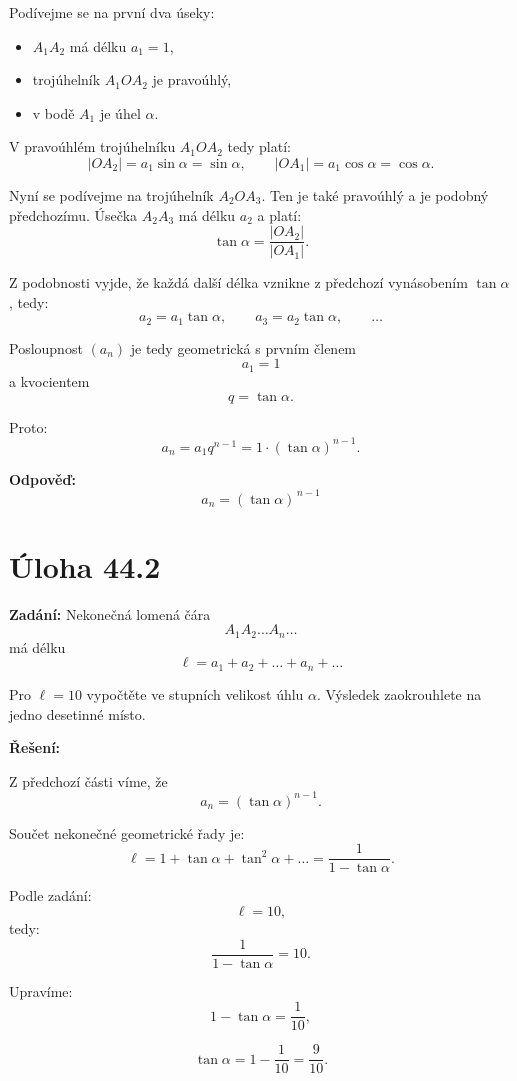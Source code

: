 \documentclass[12pt,a4paper]{article}
\begin{document}
\medskip

Podívejme se na první dva úseky:

\begin{itemize}
    \item \(A_1A_2\) má délku \(a_1=1\),
    \item trojúhelník \(A_1OA_2\) je pravoúhlý,
    \item v bodě \(A_1\) je úhel \(\alpha\).
\end{itemize}

V pravoúhlém trojúhelníku \(A_1OA_2\) tedy platí:
\[
|OA_2| = a_1\sin\alpha = \sin\alpha,
\qquad
|OA_1| = a_1\cos\alpha = \cos\alpha.
\]

Nyní se podívejme na trojúhelník \(A_2OA_3\). Ten je také pravoúhlý a je podobný předchozímu.  
Úsečka \(A_2A_3\) má délku \(a_2\) a platí:
\[
\tan\alpha=\frac{|OA_2|}{|OA_1|}.
\]

Z podobnosti vyjde, že každá další délka vznikne z předchozí vynásobením \(\tan\alpha\), tedy:
\[
a_2=a_1\tan\alpha,
\qquad
a_3=a_2\tan\alpha,
\qquad
\dots
\]

Posloupnost \((a_n)\) je tedy geometrická s prvním členem
\[
a_1=1
\]
a kvocientem
\[
q=\tan\alpha.
\]

Proto:
\[
a_n=a_1q^{n-1}=1\cdot (\tan\alpha)^{n-1}.
\]

\bigskip

\textbf{Odpověď:}
\[
a_n=(\tan\alpha)^{\,n-1}
\]

\section*{Úloha 44.2}

\textbf{Zadání:}  
Nekonečná lomená čára
\[
A_1A_2\dots A_n\dots
\]
má délku
\[
\ell=a_1+a_2+\dots+a_n+\dots
\]

Pro \(\ell=10\) vypočtěte ve stupních velikost úhlu \(\alpha\).  
Výsledek zaokrouhlete na jedno desetinné místo.

\bigskip

\textbf{Řešení:}

Z předchozí části víme, že
\[
a_n=(\tan\alpha)^{n-1}.
\]

Součet nekonečné geometrické řady je:
\[
\ell=1+\tan\alpha+\tan^2\alpha+\dots
=\frac{1}{1-\tan\alpha}.
\]

Podle zadání:
\[
\ell=10,
\]
tedy:
\[
\frac{1}{1-\tan\alpha}=10.
\]

Upravíme:
\[
1-\tan\alpha=\frac{1}{10},
\]

\[
\tan\alpha=1-\frac{1}{10}=\frac{9}{10}.
\]
\end{document}
